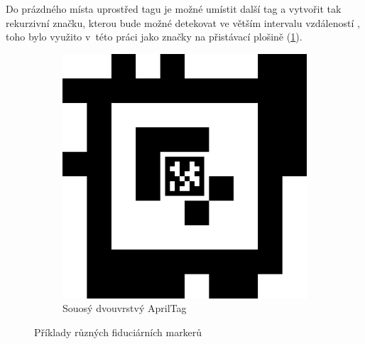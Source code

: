       Do prázdného místa uprostřed tagu je možné umístit další tag a vytvořit tak rekurzivní značku, kterou bude možné detekovat ve větším intervalu vzdáleností \cite{apriltag3}, toho bylo využito v~této práci jako značky na přistávací plošině (\cref{fig:customAprilTag}).

      \begin{figure}
        \centering
        \begin{subfigure}[b]{0.2\textwidth}
          \includegraphics[width=\textwidth]{img/tag_48_12__36_11_164__137.png}
          \caption{Souosý dvouvrstvý AprilTag}
          \label{fig:customAprilTag}
        \end{subfigure}
        \caption{Příklady různých fiduciárních markerů}
        \label{fig:markery}
      \end{figure}
      